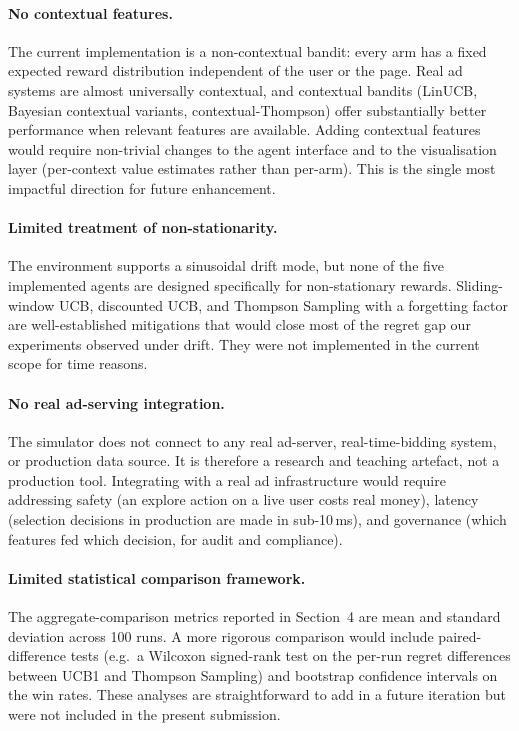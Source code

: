 \paragraph{No contextual features.} The current implementation is a non-contextual bandit: every arm has a fixed expected reward distribution independent of the user or the page. Real ad systems are almost universally contextual, and contextual bandits (LinUCB, Bayesian contextual variants, contextual-Thompson) offer substantially better performance when relevant features are available. Adding contextual features would require non-trivial changes to the agent interface and to the visualisation layer (per-context value estimates rather than per-arm). This is the single most impactful direction for future enhancement.

\paragraph{Limited treatment of non-stationarity.} The environment supports a sinusoidal drift mode, but none of the five implemented agents are designed specifically for non-stationary rewards. Sliding-window UCB, discounted UCB, and Thompson Sampling with a forgetting factor are well-established mitigations that would close most of the regret gap our experiments observed under drift. They were not implemented in the current scope for time reasons.

\paragraph{No real ad-serving integration.} The simulator does not connect to any real ad-server, real-time-bidding system, or production data source. It is therefore a research and teaching artefact, not a production tool. Integrating with a real ad infrastructure would require addressing safety (an explore action on a live user costs real money), latency (selection decisions in production are made in sub-10\,ms), and governance (which features fed which decision, for audit and compliance).

\paragraph{Limited statistical comparison framework.} The aggregate-comparison metrics reported in Section~4 are mean and standard deviation across 100 runs. A more rigorous comparison would include paired-difference tests (e.g.\ a Wilcoxon signed-rank test on the per-run regret differences between UCB1 and Thompson Sampling) and bootstrap confidence intervals on the win rates. These analyses are straightforward to add in a future iteration but were not included in the present submission.

